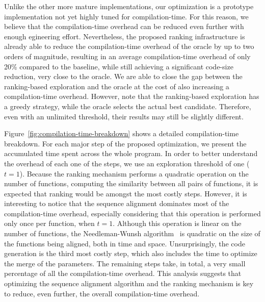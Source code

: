 Unlike the other more mature implementations, our optimization is a prototype
implementation not yet highly tuned for compilation-time.
For this reason, we believe that the compilation-time overhead can be reduced
even further with enough egineering effort.
Nevertheless, the proposed ranking infrastructure is already able to reduce the
compilation-time overhead of the oracle by up to two orders of magnitude, 
resulting in  an average compilation-time overhead of only 20\% compared to the
baseline, while still achieving a significant code-size reduction, very close to
the oracle.
We are able to close the gap between the ranking-based exploration and the
oracle at the cost of also increasing a compilation-time overhead.
However, note that the ranking-based exploration has a greedy strategy, while
the oracle selects the actual best candidate.
Therefore, even with an unlimited threshold, their results may still be slightly
different.

Figure~\ref{fig:compilation-time-breakdown} shows a detailed compilation-time
breakdown.
For each major step of the proposed optimization, we present the accumulated
time spent across the whole program.
In order to better understand the overhead of each one of the steps, we use
an exploration threshold of one ($t = 1$). 
Because the ranking mechanism performs a quadratic operation on the number of
functions, computing the similarity between all pairs of functions, it is
expected that ranking would be amongst the most costly steps.
However, it is interesting to notice that the sequence alignment dominates most
of the compilation-time overhead, especially considering that this operation is
performed only once per function, when $t = 1$.
Although this operation is linear on the number of functions, the
Needleman-Wunsh algorithm~\cite{needleman70} is quadratic on the size of the
functions being aligned, both in time and space.
Unsurprisingly, the code generation is the third most costly step, which also
includes the time to optimize the merge of the parameters.
The remaining steps take, in total, a very small percentage of all the
compilation-time overhead.
This analysis suggests that optimizing the sequence alignment algorithm and
the ranking mechanism is key to reduce, even further, the overall
compilation-time overhead.

